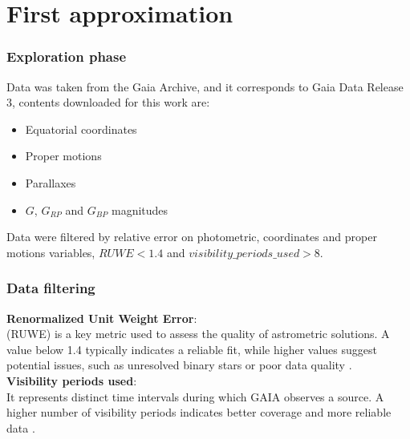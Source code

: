 \documentclass{beamer}
\begin{document}
\section{First approximation}

\begin{frame}
\frametitle{Exploration phase}
\begin{minipage}\textwidth
    Data was taken from the Gaia Archive, and it corresponds to Gaia Data Release 3, contents downloaded for this work are: \\
    \begin{itemize}
        \item Equatorial coordinates
        \item Proper motions
        \item Parallaxes
        \item $G$, $G_{RP}$ and $G_{BP}$ magnitudes
    \end{itemize}
    \vspace{0.5cm}
    
    Data were filtered by relative error on photometric, coordinates and proper motions variables, $RUWE<1.4$ and $visibility\_periods\_used>8$.
\end{minipage}
\end{frame}

\begin{frame}
\frametitle{Data filtering}
\begin{minipage}\textwidth
\textbf{Renormalized Unit Weight Error}:
\vspace{2mm}\\
(RUWE) is a key metric used to assess the quality of astrometric solutions. A value below 1.4 typically indicates a reliable fit, while higher values suggest potential issues, such as unresolved binary stars or poor data quality \cite{lindegren2021}.\\
    
\textbf{Visibility periods used}:
\vspace{2mm}\\
It represents distinct time intervals during which GAIA observes a source. A higher number of visibility periods indicates better coverage and more reliable data \cite{lindegren2018}.
\end{minipage}
\end{frame}
\end{document}
